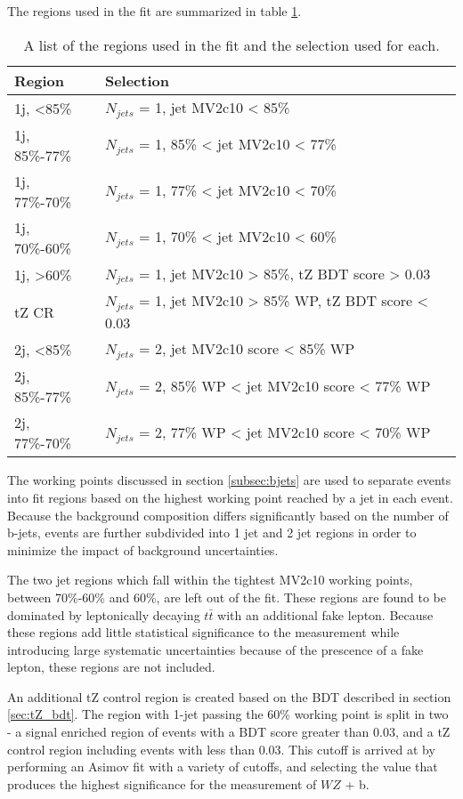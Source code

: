 
The regions used in the fit are summarized in table \ref{tab:regions}.

\begin{table}[h]
\centering
\caption{A list of the regions used in the fit and the selection used for each.}
\begin{tabular}{l|l}
\hline\hline
Region & Selection  	      \\
\hline
\hline
1j, <85\%	& $N_{jets}$ = 1, jet MV2c10 < 85\%		      \\
1j, 85\%-77\%	& $N_{jets}$ = 1, 85\% < jet MV2c10 < 77\% 		      \\
1j, 77\%-70\%	& $N_{jets}$ = 1, 77\% < jet MV2c10 < 70\% 		      \\
1j, 70\%-60\%	& $N_{jets}$ = 1, 70\% < jet MV2c10 < 60\% 		      \\
1j, >60\%	& $N_{jets}$ = 1, jet MV2c10 > 85\%, tZ BDT score > 0.03 \\
tZ CR	& $N_{jets}$ = 1, jet MV2c10 > 85\% WP, tZ BDT score < 0.03 \\
2j, <85\%	& $N_{jets}$ = 2, jet MV2c10 score < 85\% WP		      \\
2j, 85\%-77\%	& $N_{jets}$ = 2, 85\% WP < jet MV2c10 score < 77\% WP		      \\
2j, 77\%-70\%	& $N_{jets}$ = 2, 77\% WP < jet MV2c10 score < 70\% WP		      \\
\hline\hline
\end{tabular}
\label{tab:regions}
\end{table}

The working points discussed in section \ref{subsec:bjets} are used to separate events into fit regions based on the highest working point reached by a jet in each event. Because the background composition differs significantly based on the number of b-jets, events are further subdivided into 1 jet and 2 jet regions in order to minimize the impact of background uncertainties. 

The two jet regions which fall within the tightest MV2c10 working points, between 70\%-60\% and 60\%, are left out of the fit. These regions are found to be dominated by leptonically decaying $t\bar{t}$ with an additional fake lepton. Because these regions add little statistical significance to the measurement while introducing large systematic uncertainties because of the prescence of a fake lepton, these regions are not included.

An additional tZ control region is created based on the BDT described in section \ref{sec:tZ_bdt}. The region with 1-jet passing the 60\% working point is split in two - a signal enriched region of events with a BDT score greater than 0.03, and a tZ control region including events with less than 0.03. This cutoff is arrived at by performing an Asimov fit with a variety of cutoffs, and selecting the value that produces the highest significance for the measurement of $WZ$ + b. 

